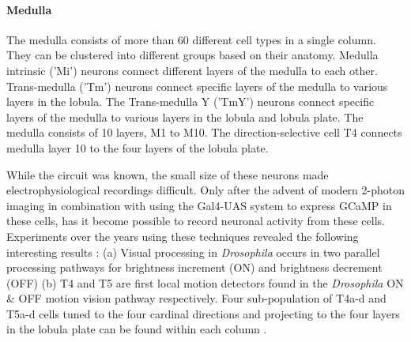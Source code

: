 \paragraph{Medulla}
The medulla consists of more than 60 different cell types in a single column. They can be clustered into different groups based on their anatomy. Medulla intrinsic ('Mi') neurons connect different layers of the medulla to each other. Trans-medulla ('Tm') neurons connect specific layers of the medulla to various layers in the lobula. The Trans-medulla Y ('TmY') neurons connect specific layers of the medulla to various layers in the lobula and lobula plate. The medulla consists of 10 layers, M1 to M10. The direction-selective cell T4 connects medulla layer 10 to the four layers of the lobula plate.

While the circuit was known, the small size of these neurons made electrophysiological recordings difficult. Only after the advent of modern 2-photon imaging in combination with using the Gal4-UAS system to express GCaMP in these cells, has it become possible to record neuronal activity from these cells. Experiments over the years using these techniques revealed the following interesting results : (a) Visual processing in \textit{Drosophila} occurs in two parallel processing pathways for brightness increment (ON) and brightness decrement (OFF) \parencite{Joesch2010, Joesch2013, Strother2014, Eichner2011, Behnia2014} (b) T4 and T5 are first local motion detectors found in the \textit{Drosophila} ON \& OFF motion vision pathway respectively. Four sub-population of T4a-d and T5a-d cells tuned to the four cardinal directions and projecting to the four layers in the lobula plate can be found within each column \parencite{Maisak2013}. 


